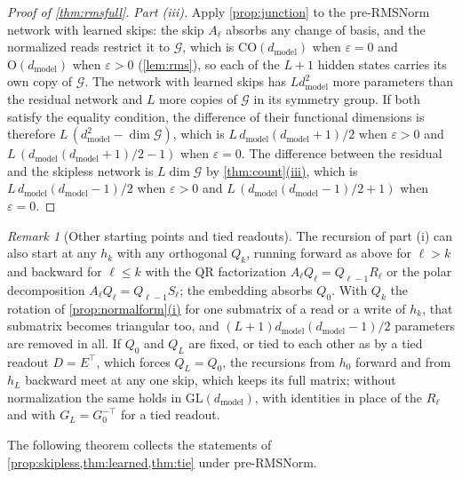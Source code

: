 \documentclass[10pt]{article}
\theoremstyle{definition}
\theoremstyle{remark}
\newtheorem{remark}[theorem]{Remark}
\newcommand{\dm}{d_{\mathrm{model}}}
\newcommand{\GL}{\mathrm{GL}}
\newcommand{\Ort}{\mathrm{O}}
\newcommand{\CO}{\mathrm{CO}}
\newcommand{\G}{\mathcal{G}}
\DeclareRobustCommand{\cpref}[2]{\hyperref[#1:#2]{\cref*{#1}(#2)}}
\begin{document}
\begin{proof}[Proof of \cref{thm:rmsfull}]
\emph{Part (iii).} Apply \cref{prop:junction} to the pre-RMSNorm network with learned skips: the skip $A_\ell$ absorbs any change of basis, and the normalized reads restrict it to $\G$, which is $\CO(\dm)$ when $\varepsilon = 0$ and $\Ort(\dm)$ when $\varepsilon > 0$ (\cref{lem:rms}), so each of the $L+1$ hidden states carries its own copy of $\G$. The network with learned skips has $L\dm^2$ more parameters than the residual network and $L$ more copies of $\G$ in its symmetry group. If both satisfy the equality condition, the difference of their functional dimensions is therefore $L\,(\dm^2 - \dim\G)$, which is $L\,\dm(\dm+1)/2$ when $\varepsilon > 0$ and $L\,(\dm(\dm+1)/2 - 1)$ when $\varepsilon = 0$. The difference between the residual and the skipless network is $L\dim\G$ by \cpref{thm:count}{iii}, which is $L\,\dm(\dm-1)/2$ when $\varepsilon > 0$ and $L\,(\dm(\dm-1)/2 + 1)$ when $\varepsilon = 0$.
\end{proof}

\begin{remark}[Other starting points and tied readouts]\label{rem:rmsstart}
The recursion of part (i) can also start at any $h_k$ with any orthogonal $Q_k$, running forward as above for $\ell > k$ and backward for $\ell \le k$ with the QR factorization $A_\ell Q_\ell = Q_{\ell-1}R_\ell$ or the polar decomposition $A_\ell Q_\ell = Q_{\ell-1}S_\ell$; the embedding absorbs $Q_0$. With $Q_k$ the rotation of \cpref{prop:normalform}{i} for one submatrix of a read or a write of $h_k$, that submatrix becomes triangular too, and $(L+1)\dm(\dm-1)/2$ parameters are removed in all. If $Q_0$ and $Q_L$ are fixed, or tied to each other as by a tied readout $D = E^\top$, which forces $Q_L = Q_0$, the recursions from $h_0$ forward and from $h_L$ backward meet at any one skip, which keeps its full matrix; without normalization the same holds in $\GL(\dm)$, with identities in place of the $R_\ell$ and with $G_L = G_0^{-\top}$ for a tied readout.
\end{remark}

The following theorem collects the statements of \cref{prop:skipless,thm:learned,thm:tie} under pre-RMSNorm.
\end{document}
